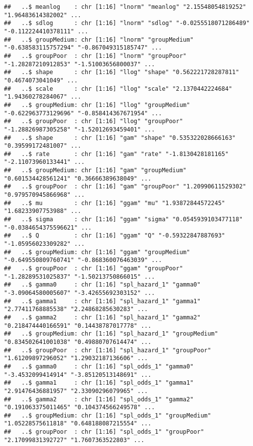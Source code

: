 \documentclass[
]{article}
\begin{document}
\begin{verbatim}
##   ..$ meanlog    : chr [1:16] "lnorm" "meanlog" "2.15548054819252" "1.96483614382002" ...
##   ..$ sdlog      : chr [1:16] "lnorm" "sdlog" "-0.0255518071286489" "-0.112224410378111" ...
##   ..$ groupMedium: chr [1:16] "lnorm" "groupMedium" "-0.638583115757294" "-0.867049315185747" ...
##   ..$ groupPoor  : chr [1:16] "lnorm" "groupPoor" "-1.28287210912853" "-1.51003656800037" ...
##   ..$ shape      : chr [1:16] "llog" "shape" "0.562221728287811" "0.4674073041049" ...
##   ..$ scale      : chr [1:16] "llog" "scale" "2.1370442224684" "1.94360278284067" ...
##   ..$ groupMedium: chr [1:16] "llog" "groupMedium" "-0.622963773129696" "-0.858414367671954" ...
##   ..$ groupPoor  : chr [1:16] "llog" "groupPoor" "-1.28826987305258" "-1.52012693459401" ...
##   ..$ shape      : chr [1:16] "gam" "shape" "0.535322028666163" "0.39599172481007" ...
##   ..$ rate       : chr [1:16] "gam" "rate" "-1.8130428181165" "-2.11073960133441" ...
##   ..$ groupMedium: chr [1:16] "gam" "groupMedium" "0.601534428561241" "0.36666389638049" ...
##   ..$ groupPoor  : chr [1:16] "gam" "groupPoor" "1.20990611529302" "0.979570945866968" ...
##   ..$ mu         : chr [1:16] "ggam" "mu" "1.93872844572245" "1.68233907753988" ...
##   ..$ sigma      : chr [1:16] "ggam" "sigma" "0.0545939103477118" "-0.0384654375596621" ...
##   ..$ Q          : chr [1:16] "ggam" "Q" "-0.59322847887693" "-1.05956023309282" ...
##   ..$ groupMedium: chr [1:16] "ggam" "groupMedium" "-0.649550809760741" "-0.868360076463039" ...
##   ..$ groupPoor  : chr [1:16] "ggam" "groupPoor" "-1.28289531025837" "-1.50213750866015" ...
##   ..$ gamma0     : chr [1:16] "spl_hazard_1" "gamma0" "-3.09064580005607" "-3.42655692303152" ...
##   ..$ gamma1     : chr [1:16] "spl_hazard_1" "gamma1" "2.77411768885538" "2.24868285630283" ...
##   ..$ gamma2     : chr [1:16] "spl_hazard_1" "gamma2" "0.218474440166591" "0.14438787017778" ...
##   ..$ groupMedium: chr [1:16] "spl_hazard_1" "groupMedium" "0.834502641001038" "0.49880707614474" ...
##   ..$ groupPoor  : chr [1:16] "spl_hazard_1" "groupPoor" "1.61209897296052" "1.29032187136606" ...
##   ..$ gamma0     : chr [1:16] "spl_odds_1" "gamma0" "-3.4532099414914" "-3.85120513148691" ...
##   ..$ gamma1     : chr [1:16] "spl_odds_1" "gamma1" "2.91476436881957" "2.33090296079965" ...
##   ..$ gamma2     : chr [1:16] "spl_odds_1" "gamma2" "0.191063375011465" "0.104374566249578" ...
##   ..$ groupMedium: chr [1:16] "spl_odds_1" "groupMedium" "1.05228575611818" "0.648188087215554" ...
##   ..$ groupPoor  : chr [1:16] "spl_odds_1" "groupPoor" "2.17099831392727" "1.7607363522803" ...

\end{verbatim}
\end{document}
